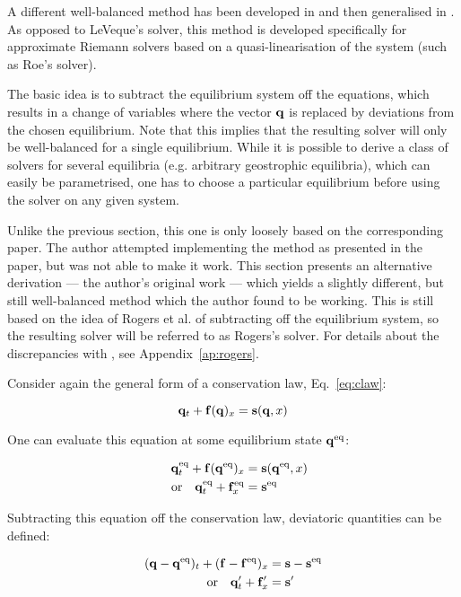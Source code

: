 A different well-balanced method has been developed in \citet{rogers2001adaptive} and then generalised in \citet{rogers2003mathematical}. As opposed to LeVeque's solver, this method is developed specifically for approximate Riemann solvers based on a quasi-linearisation of the system (such as Roe's solver).

The basic idea is to subtract the equilibrium system off the equations, which results in a change of variables where the vector $\vb q$ is replaced by deviations from the chosen equilibrium. Note that this implies that the resulting solver will only be well-balanced for a single equilibrium. While it is possible to derive a class of solvers for several equilibria (e.g. arbitrary geostrophic equilibria), which can easily be parametrised, one has to choose a particular equilibrium before using the solver on any given system.

Unlike the previous section, this one is only loosely based on the corresponding paper. The author attempted implementing the method as presented in the paper, but was not able to make it work. This section presents an alternative derivation --- the author's original work --- which yields a slightly different, but still well-balanced method which the author found to be working. This is still based on the idea of Rogers et al. of subtracting off the equilibrium system, so the resulting solver will be referred to as Rogers's solver. For details about the discrepancies with \citet{rogers2003mathematical}, see Appendix~\ref{ap:rogers}.

Consider again the general form of a conservation law, Eq.~\ref{eq:claw}:

$$
  \vb q_t + \vb f(\vb q)_x = \vb s(\vb q, x)
$$

One can evaluate this equation at some equilibrium state $\vb q^\mathrm{eq}$:

\begin{align}
  \eq{\vb q}_t + \vb f(\eq{\vb q})_x &= \vb s(\eq{\vb q}, x) \\
  \qq{or} \eq{\vb q}_t + \eq{\vb f}_x &= \eq{\vb s}
\end{align}

Subtracting this equation off the conservation law, deviatoric quantities can be defined:

\begin{align}
  (\vb q - \eq{\vb q})_t + (\vb f - \eq{\vb f})_x &= \vb s - \eq{\vb s} \\
  \qq{or} \vb q'_t + \vb f'_x &= \vb s'
\end{align}

